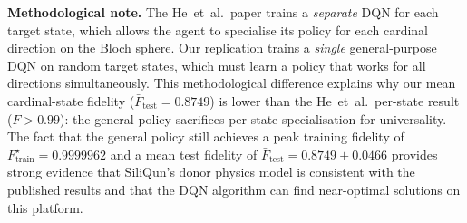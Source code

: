 \begin{table}[ht]
\centering
\caption{Replication~2 results: DQN universal state preparation on SiliQun \texttt{donor\_electron} profile (5 seeds), shown side by side with published targets of He~et~al.~\cite{He2021}. Published values use separate specialist agents per state; ours uses a single general-purpose DQN. $\bar{F}_\text{test}$ = mean test fidelity across 5 seeds; $F_\text{train}^\star$ = best training fidelity across 5 seeds.}
\label{tab:r2_results}
\end{table}

\textbf{Methodological note.} The He~et~al.\ paper trains a \emph{separate} DQN for each target state, which allows the agent to specialise its policy for each cardinal direction on the Bloch sphere. Our replication trains a \emph{single} general-purpose DQN on random target states, which must learn a policy that works for all directions simultaneously. This methodological difference explains why our mean cardinal-state fidelity ($\bar{F}_\text{test} = 0.8749$) is lower than the He~et~al.\ per-state result ($F > 0.99$): the general policy sacrifices per-state specialisation for universality. The fact that the general policy still achieves a peak training fidelity of $F_\text{train}^\star = 0.9999962$ and a mean test fidelity of $\bar{F}_\text{test} = 0.8749 \pm 0.0466$ provides strong evidence that SiliQun's donor physics model is consistent with the published results and that the DQN algorithm can find near-optimal solutions on this platform.


